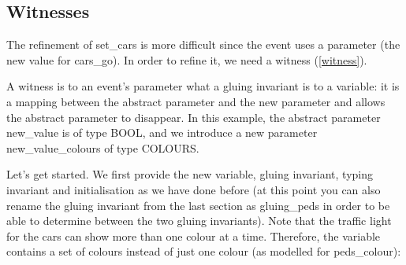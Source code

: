 \subsection{Witnesses}
\label{tut_extend_traffic_witnesses}

The refinement of \textsf{set\_cars} is more difficult since the event uses a parameter (the new value for \textsf{cars\_go}).  In order to refine it, we need a witness (\ref{witness}).

A witness is to an event's parameter what a gluing invariant is to a variable: it is a mapping between the abstract parameter and the new parameter and allows the abstract parameter to disappear.  In this example, the abstract parameter \textsf{new\_value} is of type \textsf{BOOL}, and we introduce a new parameter \textsf{new\_value\_colours} of type \textsf{COLOURS}.


Let's get started.  We first provide the new variable, gluing invariant, typing invariant and initialisation as we have done before (at this point you can also rename the gluing invariant from the last section as \textsf{gluing\_peds} in order to be able to determine between the two gluing invariants).  Note that the traffic light for the cars can show more than one colour at a time.  Therefore, the variable contains a set of colours instead of just one colour (as modelled for \textsf{peds\_colour}):


